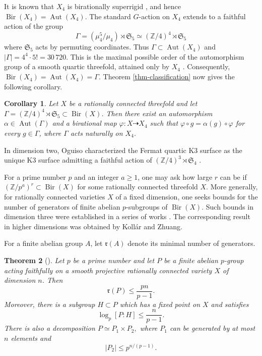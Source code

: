 \documentclass[10pt,oneside,reqno]{amsart}
\numberwithin{equation}{section}
\newtheorem{theorem}{Theorem}[section]
\newtheorem{corollary}[theorem]{Corollary}
\theoremstyle{definition}
\newcommand{\Z}{\mathbb Z}
\begin{document}
It is known that $X_4$ is birationally superrigid
\cite{IskovskikhManin}, and hence
$\operatorname{Bir}(X_4)=\operatorname{Aut}(X_4)$.  The standard
$G$-action on $X_4$ extends to a faithful action of the group
\begin{equation}
 \Gamma=(\mu_4^5/\mu_4)\rtimes\mathfrak S_5
 \simeq(\Z/4)^4\rtimes\mathfrak S_5
 \label{eq-full-fermat-group}
\end{equation}
where $\mathfrak S_5$ acts by permuting coordinates. 
Thus $\Gamma\subset\operatorname{Aut}(X_4)$ and
$|\Gamma|=4^4\cdot5!=30\,720$.  This is the maximal possible order of
the automorphism group of a smooth quartic threefold, attained only by
$X_4$ \cite[Theorem 1.1]{YangYuZhu}.  Consequently,
$\operatorname{Bir}(X_4)=\operatorname{Aut}(X_4)=\Gamma$.  Theorem
\ref{thm-classification} now gives the following corollary.

\begin{corollary}
\label{cor-unique-gamma-model}
Let $X$ be a rationally connected threefold and let
$\Gamma=(\Z/4)^4\rtimes\mathfrak S_5\subset\operatorname{Bir}(X)$.  Then
there exist an automorphism $\alpha\in\operatorname{Aut}(\Gamma)$ and
a birational map $\varphi\colon X\dashrightarrow X_4$ such that
$\varphi\circ g=\alpha(g)\circ\varphi$ for every
$g\in\Gamma$, where $\Gamma$ acts naturally on $X_4$.
\end{corollary}

In dimension two, Oguiso characterized the Fermat quartic K3 surface
as the unique K3 surface admitting a faithful action of
$(\Z/4)^3\rtimes\mathfrak S_4$
\cite[Theorem 1.2]{OguisoFermatK3}.

For a prime number $p$ and an integer $a\geq1$, one may ask how large
$r$ can be if $(\mathbb{Z}/p^a)^r\subset\operatorname{Bir}(X)$ for
some rationally connected threefold $X$.  More generally, for rationally
connected varieties $X$ of a fixed dimension, one seeks bounds for the
number of generators of finite abelian $p$-subgroups of
$\operatorname{Bir}(X)$.  Such bounds in dimension three were
established in a series of works
\cite{ProkhorovElementary,Prokhorov2Elementary,
ProkhorovShramovP,Kuznetsova3,XuRank,Loginov3}.  The corresponding
result in higher dimensions was obtained by Koll\'ar and Zhuang.

For a finite abelian group $A$, let $\mathfrak r(A)$ denote its minimal
number of generators.

\begin{theorem}[{\cite[Proposition~8, Remark~10, and
Corollary~11]{KZh24}}]
\label{thm-kollar-zhuang}
Let $p$ be a prime number and let $P$ be a finite abelian $p$-group
acting faithfully on a smooth projective rationally connected variety
$X$ of dimension $n$.  Then
\begin{equation}
\label{eq-bound}
 \mathfrak r(P)\leq\frac{pn}{p-1}.
\end{equation}
Moreover, there is a subgroup $H\subset P$ which has a fixed point on
$X$ and satisfies
\[
 \log_p[P:H]\leq\frac{n}{p-1}.
\]
There is also a decomposition
$
 P\simeq P_1\times P_2,
$
where $P_1$ can be generated by at most $n$ elements and
\[
 |P_2|\leq p^{n/(p-1)}.
\]
\end{theorem}
\end{document}
